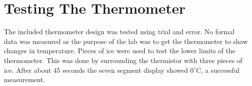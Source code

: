 \documentclass[main.tex]{subfiles}
\begin{document}
\chapter{Testing The Thermometer}

The included thermometer design was tested using trial and error. No formal data
was measured as the purpose of the lab was to get the thermometer to show
changes in temperature. Pieces of ice were used to test the lower limits of the
thermometer. This was done by surrounding the thermistor with three pieces of
ice. After about $45$ seconds the seven segment display showed
$0^{\circ}\mathrm{C}$, a successful measurement. 
\end{document}
